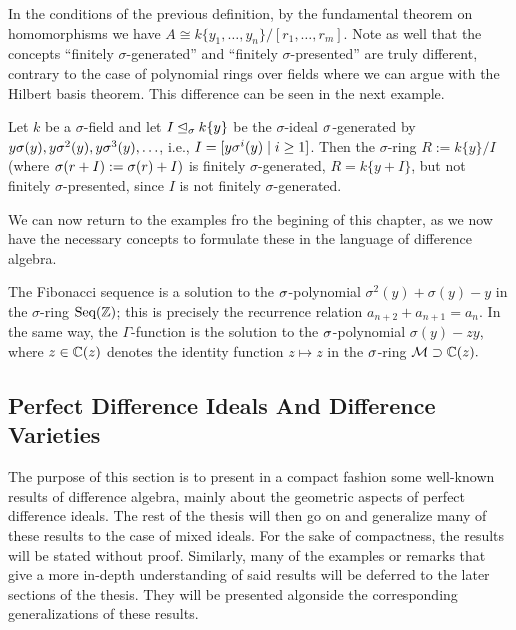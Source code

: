\begin{rem}
In the conditions of the previous definition, by the fundamental theorem on homomorphisms we have $A \cong k\{y_1, \ldots, y_n\}/[r_1,\ldots,r_m]$. Note as well that the concepts ``finitely $\sigma$-generated'' and ``finitely $\sigma$-presented'' are truly different, contrary to the case of polynomial rings over fields where we can argue with the Hilbert basis theorem. This difference can be seen in the next example.
\end{rem}

\begin{ex}
Let $k$ be a $\sigma$-field and let $I \unlhd_{\sigma} k\{y\} $ be the $\sigma$-ideal $\sigma$-generated by $y\sigma(y), y\sigma^2(y), y\sigma^3(y), \ldots$, i.e., $I = [y \sigma^i(y) \mid i\geq 1]$. Then the $\sigma$-ring $R := k\{y\}/I$ (where $\sigma (r + I) := \sigma(r) + I)$ is 
finitely $\sigma$-generated, $R = k\{ y + I \}$, but not finitely $\sigma$-presented, since $I$ is not finitely $\sigma$-generated.
\end{ex}


We can now return to the examples fro the begining of this chapter, as we now have the necessary concepts to formulate these in the language of difference algebra. 

\begin{ex}
The Fibonacci sequence is a solution to the $\sigma$-polynomial $\sigma^2(y) + \sigma(y) - y$ in the $\sigma$-ring  $\text{Seq}(\mathbb{Z})$; this is precisely the recurrence relation $a_{n+2} + a_{n+1} = a_n$.
In the same way, the $\Gamma$-function is the solution to the $\sigma$-polynomial $\sigma(y) - zy$, where $z \in \mathbb{C}(z)$ denotes the identity function $z \mapsto z$ in the $\sigma$-ring $\mathcal{M} \supset \mathbb{C}(z).$
\end{ex}

\subsection{Perfect Difference Ideals And Difference Varieties}

The purpose of this section is to present in a compact fashion some well-known results of difference algebra, mainly about the geometric aspects of perfect difference ideals. 
The rest of the thesis will then go on and generalize many of these results to the case of mixed ideals. For the sake of compactness, the results will be stated without proof.
Similarly, many of the examples or remarks that give a more in-depth understanding of said results will be deferred to the later sections of the thesis. 
They will be presented algonside the corresponding generalizations of these results.

